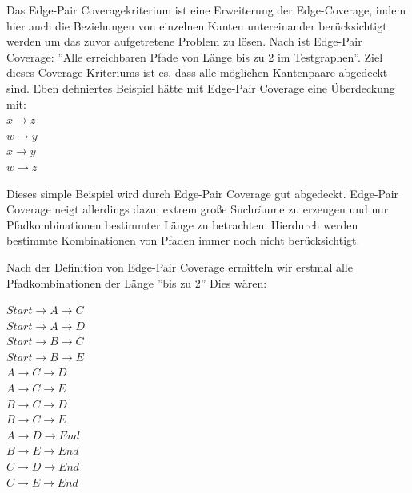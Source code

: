 Das Edge-Pair Coveragekriterium ist eine Erweiterung der Edge-Coverage, indem hier auch die Beziehungen von einzelnen Kanten untereinander berücksichtigt werden um das zuvor
aufgetretene Problem zu lösen.
Nach \cite[Introduction to Software Testing]{software-testing} ist Edge-Pair Coverage: ''Alle erreichbaren Pfade von Länge bis zu 2 im Testgraphen''.
Ziel dieses Coverage-Kriteriums ist es, dass alle möglichen Kantenpaare abgedeckt sind.
Eben definiertes Beispiel hätte mit Edge-Pair Coverage eine Überdeckung mit: \\
$ x \rightarrow z $ \\
$ w \rightarrow y $ \\
$ x \rightarrow y $ \\
$ w \rightarrow z $

Dieses simple Beispiel wird durch Edge-Pair Coverage gut abgedeckt.
Edge-Pair Coverage neigt allerdings dazu, extrem große Suchräume zu erzeugen und nur Pfadkombinationen bestimmter Länge zu betrachten. \cite[vgl. S. 35]{software-testing}
Hierdurch werden bestimmte Kombinationen von Pfaden immer noch nicht berücksichtigt.


Nach der Definition von Edge-Pair Coverage ermitteln wir erstmal alle Pfadkombinationen der Länge ''bis zu 2''
Dies wären:

$Start \rightarrow A \rightarrow C$ \\
$Start \rightarrow A \rightarrow D$ \\
$Start \rightarrow B \rightarrow C$ \\
$Start \rightarrow B \rightarrow E$ \\
$A \rightarrow C \rightarrow D$ \\
$A \rightarrow C \rightarrow E$ \\
$B \rightarrow C \rightarrow D$ \\
$B \rightarrow C \rightarrow E$ \\
$A \rightarrow D \rightarrow End$ \\
$B \rightarrow E \rightarrow End$ \\
$C \rightarrow D \rightarrow End$ \\
$C \rightarrow E \rightarrow End$ \\

